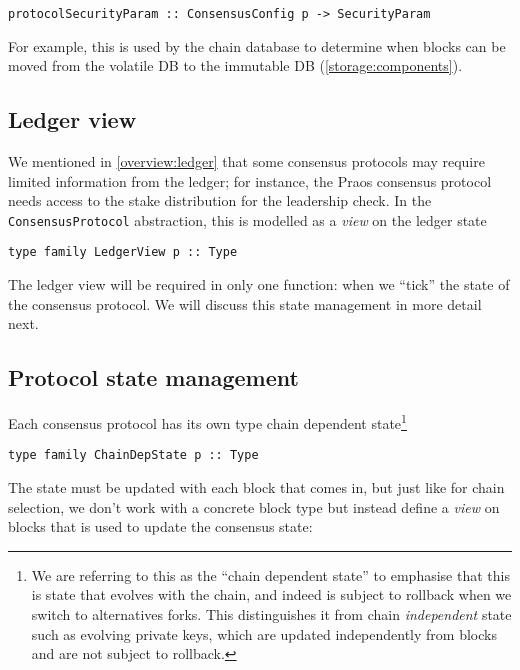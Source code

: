 \begin{lstlisting}
protocolSecurityParam :: ConsensusConfig p -> SecurityParam
\end{lstlisting}

For example, this is used by the chain database to determine when blocks can be
moved from the volatile DB to the immutable DB
(\cref{storage:components}).

\subsection{Ledger view}
\label{class:ConsensusProtocol:ledgerview}

We mentioned in \cref{overview:ledger} that some consensus protocols may require
limited information from the ledger; for instance, the Praos consensus protocol
needs access to the stake distribution for the leadership check. In the
\lstinline!ConsensusProtocol! abstraction, this is modelled as a \emph{view}
on the ledger state

\begin{lstlisting}
type family LedgerView p :: Type
\end{lstlisting}

The ledger view will be required in only one function: when we ``tick'' the
state of the consensus protocol. We will discuss this state management in more
detail next.

\subsection{Protocol state management}
\label{class:ConsensusProtocol:state}

Each consensus protocol has its own type chain dependent state\footnote{We are
referring to this as the ``chain dependent state'' to emphasise that this is
state that evolves with the chain, and indeed is subject to rollback when we
switch to alternatives forks. This distinguishes it from chain
\emph{independent} state such as evolving private keys, which are updated
independently from blocks and are not subject to rollback.}

\begin{lstlisting}
type family ChainDepState p :: Type
\end{lstlisting}

The state must be updated with each block that comes in, but just like for
chain selection, we don't work with a concrete block type but instead define a
\emph{view} on blocks that is used to update the consensus state:

